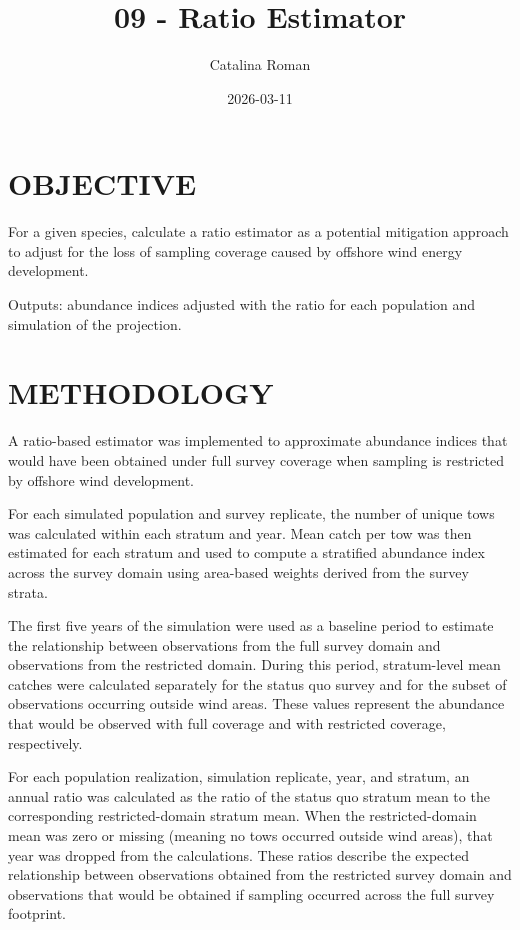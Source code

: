 \documentclass[
]{article}
\title{09 - Ratio Estimator}
\author{Catalina Roman}
\date{2026-03-11}
\begin{document}
\maketitle

\section{OBJECTIVE}\label{objective}

For a given species, calculate a ratio estimator as a potential
mitigation approach to adjust for the loss of sampling coverage caused
by offshore wind energy development.

Outputs: abundance indices adjusted with the ratio for each population
and simulation of the projection.

\section{METHODOLOGY}\label{methodology}

A ratio-based estimator was implemented to approximate abundance indices
that would have been obtained under full survey coverage when sampling
is restricted by offshore wind development.

For each simulated population and survey replicate, the number of unique
tows was calculated within each stratum and year. Mean catch per tow was
then estimated for each stratum and used to compute a stratified
abundance index across the survey domain using area-based weights
derived from the survey strata.

The first five years of the simulation were used as a baseline period to
estimate the relationship between observations from the full survey
domain and observations from the restricted domain. During this period,
stratum-level mean catches were calculated separately for the status quo
survey and for the subset of observations occurring outside wind areas.
These values represent the abundance that would be observed with full
coverage and with restricted coverage, respectively.

For each population realization, simulation replicate, year, and
stratum, an annual ratio was calculated as the ratio of the status quo
stratum mean to the corresponding restricted-domain stratum mean. When
the restricted-domain mean was zero or missing (meaning no tows occurred
outside wind areas), that year was dropped from the calculations. These
ratios describe the expected relationship between observations obtained
from the restricted survey domain and observations that would be
obtained if sampling occurred across the full survey footprint.
\end{document}
